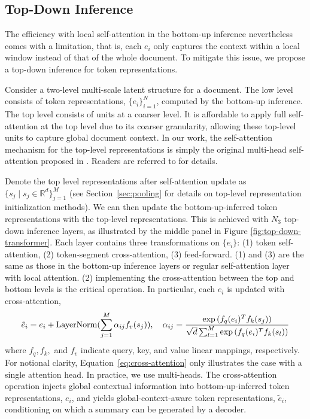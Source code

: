 \subsection{Top-Down Inference}
\label{sec:top-down}
The efficiency with local self-attention in the bottom-up inference nevertheless comes with a limitation, that is, each $e_i$ only captures the context within a local window instead of that of the whole document. To mitigate this issue, we propose a top-down inference for token representations.

Consider a two-level multi-scale latent structure for a document. The low level consists of token representations, $\{e_i\}_{i=1}^N$, computed by the bottom-up inference. The top level consists of units at a coarser level. It is affordable to apply full self-attention at the top level due to its coarser granularity, allowing these top-level units to capture global document context. In our work, the self-attention mechanism for the top-level representations is simply the original multi-head self-attention proposed in \cite{vaswani2017attention}. Readers are referred to \cite{vaswani2017attention} for details.

Denote the top level representations after self-attention update as $\{s_j \mid s_j \in \mathbb{R}^d\}_{j=1}^M$ (see Section~\ref{sec:pooling} for details on top-level representation initialization methods). We can then update the bottom-up-inferred token representations with the top-level representations. This is achieved with $N_3$ top-down inference layers, as illustrated by the middle panel in Figure \ref{fig:top-down-transformer}. Each layer contains three transformations on $\{e_i\}$: (1) token self-attention, (2) token-segment cross-attention, (3) feed-forward. (1) and (3) are the same as those in the bottom-up inference layers or regular self-attention layer with local attention. (2) implementing the cross-attention between the top and bottom levels is the critical operation. In particular, each $e_i$ is updated with cross-attention, 
\begin{equation}
    \label{eq:cross-attention}
    \tilde{e}_i = e_i + {\rm LayerNorm}(\sum_{j=1}^M \alpha_{ij} f_v(s_j)), \quad \alpha_{ij} = \frac{\exp{(f_q(e_i)^T f_k(s_j)})}{\sqrt{d}\sum_{l=1}^M \exp{(f_q(e_i)^T f_k(s_l))}}
\end{equation}
where $f_q, f_k,$ and $f_v$ indicate query, key, and value linear mappings, respectively. For notional clarity, Equation~\ref{eq:cross-attention} only illustrates the case with a single attention head. In practice, we use multi-heads. The cross-attention operation injects global contextual information into bottom-up-inferred token representations, $e_i$, and yields global-context-aware token representations, $\tilde{e}_i$, conditioning on which a summary can be generated by a decoder. 

